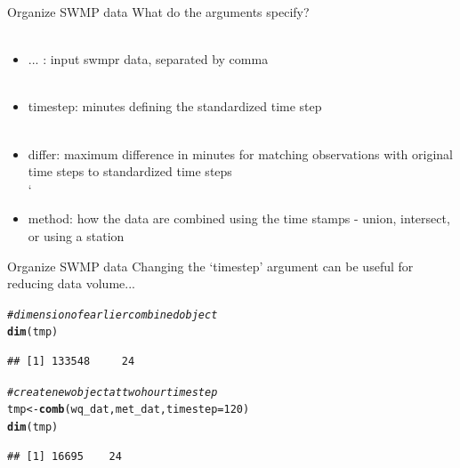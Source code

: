 \documentclass[xcolor=svgnames]{beamer}\usepackage[]{graphicx}\usepackage[]{color}
\makeatletter
\newcommand{\hlnum}[1]{\textcolor[rgb]{0.686,0.059,0.569}{#1}}%
\newcommand{\hlcom}[1]{\textcolor[rgb]{0.678,0.584,0.686}{\textit{#1}}}%
\newcommand{\hlstd}[1]{\textcolor[rgb]{0.345,0.345,0.345}{#1}}%
\newcommand{\hlkwb}[1]{\textcolor[rgb]{0.69,0.353,0.396}{#1}}%
\newcommand{\hlkwc}[1]{\textcolor[rgb]{0.333,0.667,0.333}{#1}}%
\newcommand{\hlkwd}[1]{\textcolor[rgb]{0.737,0.353,0.396}{\textbf{#1}}}%
\newenvironment{kframe}{%
 \def\at@end@of@kframe{}%
 \ifinner\ifhmode%
  \def\at@end@of@kframe{\end{minipage}}%
  \begin{minipage}{\columnwidth}%
 \fi\fi%
 \def\FrameCommand##1{\hskip\@totalleftmargin \hskip-\fboxsep
 \colorbox{shadecolor}{##1}\hskip-\fboxsep
     \hskip-\linewidth \hskip-\@totalleftmargin \hskip\columnwidth}%
 \MakeFramed {\advance\hsize-\width
   \@totalleftmargin\z@ \linewidth\hsize
   \@setminipage}}%
 {\par\unskip\endMakeFramed%
 \at@end@of@kframe}
\newenvironment{knitrout}{}{} %
\makeatother
\begin{document}
\begin{frame}[containsverbatim]{Organize SWMP data}
What do the arguments specify? \\~\\
\begin{itemize}
\item ... : input swmpr data, separated by comma\\~\\
\item timestep: minutes defining the standardized time step\\~\\
\item differ: maximum difference in minutes for matching observations with original time steps to standardized time steps \\`\\
\item method: how the data are combined using the time stamps - union, intersect, or using a station
\end{itemize}
\end{frame}

\begin{frame}[containsverbatim]{Organize SWMP data}
Changing the `timestep' argument can be useful for reducing data volume...
\begin{knitrout}\scriptsize
{}\color{fgcolor}\begin{kframe}
\begin{alltt}
\hlcom{# dimension of earlier combined object}
\hlkwd{dim}\hlstd{(tmp)}
\end{alltt}
\begin{verbatim}
## [1] 133548     24
\end{verbatim}
\begin{alltt}
\hlcom{# create new object at two hour time step}
\hlstd{tmp} \hlkwb{<-} \hlkwd{comb}\hlstd{(wq_dat, met_dat,} \hlkwc{timestep} \hlstd{=} \hlnum{120}\hlstd{)}
\hlkwd{dim}\hlstd{(tmp)}
\end{alltt}
\begin{verbatim}
## [1] 16695    24
\end{verbatim}
\end{kframe}
\end{knitrout}
\end{frame}
\end{document}
